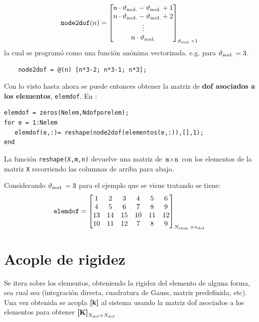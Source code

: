 \begin{equation}
	\texttt{node2dof}(n) = \begin{bmatrix}
	n\cdot\vartheta_{\mathrm{nod.}}-\vartheta_{\mathrm{nod.}} +1 \\ n\cdot\vartheta_{\mathrm{nod.}}-\vartheta_{\mathrm{nod.}} +2 \\ \vdots \\ n\cdot\vartheta_{\mathrm{nod.}}
	\end{bmatrix}_{\vartheta_{\mathrm{nod.}}\times 1}
\end{equation}
la cual se programó como una función anónima vectorizada. e.g. para $\vartheta_{\mathrm{nod.}}=3$.

\begin{lstlisting}
    node2dof = @(n) [n*3-2; n*3-1; n*3];
\end{lstlisting}

Con lo visto hasta ahora se puede entonces obtener la matriz de \textbf{dof asociados a los elementos}, \texttt{elemdof}. En \Matlab{}:
\begin{lstlisting}[caption = {Obtención de matriz elemdof.}]
elemdof = zeros(Nelem,Ndofporelem);
for e = 1:Nelem
   elemdof(e,:)= reshape(node2dof(elementos(e,:)),[],1);
end
\end{lstlisting}

La función \texttt{reshape(X,m,n)} devuelve una matriz de $\texttt{m}\times\texttt{n}$ con los elementos de la matriz \texttt{X} recorriendo las columnas de arriba para abajo.

Considerando $\vartheta_{\mathrm{nod.}}=3$ para el ejemplo que se viene tratando se tiene:
\begin{equation} \label{eq:MatrizElemdofEjemplo}
\texttt{elemdof} = \begin{bmatrix}
1 & 2 & 3 & 4 & 5 & 6 \\
4 & 5 & 6 & 7 & 8 & 9  \\
13 & 14 & 15 & 10 & 11 & 12 \\
10 & 11 & 12 & 7 & 8 & 9 
\end{bmatrix}_{ N_{\mathrm{elem.}} \times n_{\mathrm{dof}} } 
\end{equation}

\section{Acople de rigidez}
Se itera sobre los elementos, obteniendo la rigidez del elemento de alguna forma, sea cual sea (integración directa, cuadratura de Gauss, matriz predefinida, etc). Una vez obtenida se acopla $\boldsymbol{[}\mathbf{k} \boldsymbol{]}$ al sistema usando la matriz dof asociados a los elementos para obtener $\boldsymbol{[}\mathbf{K} \boldsymbol{]}_{N_{\mathrm{dof}} \times N_{\mathrm{dof}}}$

